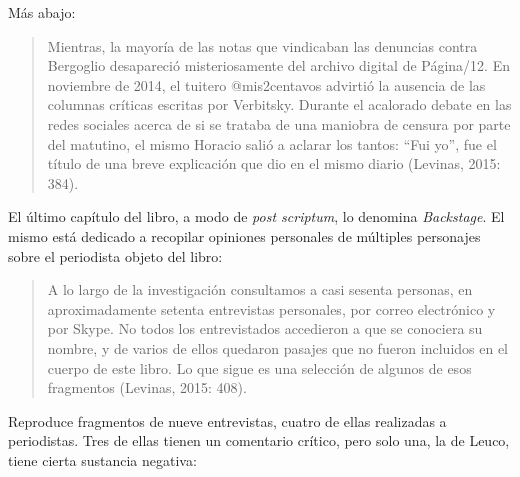 Más abajo:

\begin{quote}
Mientras, la mayoría de las notas que vindicaban las denuncias contra Bergoglio desapareció misteriosamente del archivo digital de Página/12. En noviembre de 2014, el tuitero @mis2centavos advirtió la ausencia de las columnas críticas escritas por Verbitsky. Durante el acalorado debate en las redes sociales acerca de si se trataba de una maniobra de censura por parte del matutino, el mismo Horacio salió a aclarar los tantos: \enquote{Fui yo}, fue el título de una breve explicación que dio en el mismo diario (Levinas, 2015: 384).
\end{quote}

El último capítulo del libro, a modo de \emph{post scriptum}, lo denomina \emph{Backstage}. El mismo está dedicado a recopilar opiniones personales de múltiples personajes sobre el periodista objeto del libro:

\begin{quote}
A lo largo de la investigación consultamos a casi sesenta personas, en aproximadamente setenta entrevistas personales, por correo electrónico y por Skype. No todos los entrevistados accedieron a que se conociera su nombre, y de varios de ellos quedaron pasajes que no fueron incluidos en el cuerpo de este libro. Lo que sigue es una selección de algunos de esos fragmentos (Levinas, 2015: 408).
\end{quote}

Reproduce fragmentos de nueve entrevistas, cuatro de ellas realizadas a periodistas. Tres de ellas tienen un comentario crítico, pero solo una, la de Leuco, tiene cierta sustancia negativa:

